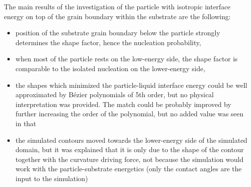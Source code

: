 The main results of the investigation of the particle with isotropic interface energy on top of the grain boundary within the substrate are the following:
\begin{itemize}
	\item position of the substrate grain boundary below the particle strongly determines the shape factor, hence the nucleation probability,
	\item when most of the particle rests on the low-energy side, the shape factor is comparable to the isolated nucleation on the lower-energy side,
	\item the shapes which minimized the particle-liquid interface energy could be well approximated by Bézier polynomials of 5th order, but no physical interpretation was provided. The match could be probably improved by further increasing the order of the polynomial, but no added value was seen in that
	\item the simulated contours moved towards the lower-energy side of the simulated domain, but it was explained that it is only due to the shape of the contour together with the curvature driving force, not because the simulation would work with the particle-substrate energetics (only the contact angles are the input to the simulation)
\end{itemize}

\cleardoublepage


